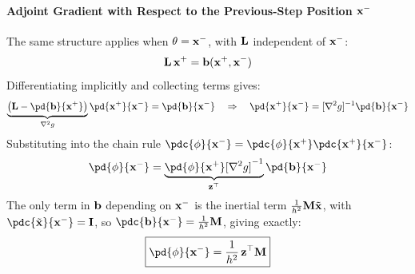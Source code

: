 \begin{derivation}
\paragraph{Adjoint Gradient with Respect to the Previous-Step Position $\mathbf{x}^-$}
\mbox{}

\noindent The same structure applies when $\theta = \mathbf{x}^-$, with $\mathbf{L}$ 
independent of $\mathbf{x}^-$:
\begin{equation*}
    \mathbf{L}\,\mathbf{x}^+ = \mathbf{b}(\mathbf{x}^+, \mathbf{x}^-)
\end{equation*}
Differentiating implicitly and collecting terms gives:
\begin{equation}
    \underbrace{\left(\LL - \pd{\bb}{\x^+}\right)}_{\nabla^2 g}
    \pd{\x^+}{\x^-}
    =
    \pd{\bb}{\x^-}
    \quad\Rightarrow\quad
    \pd{\x^+}{\x^-} = [\nabla^2 g]^{-1}\pd{\bb}{\x^-}
\end{equation}
Substituting into the chain rule $\pdc{\phi}{\x^-} = 
\pdc{\phi}{\x^+}\pdc{\x^+}{\x^-}$:
\begin{equation}
    \pd{\phi}{\x^-}
    =
    \underbrace{\pd{\phi}{\x^+}[\nabla^2 g]^{-1}}_{\z^\top}
    \pd{\bb}{\x^-}
\end{equation}
The only term in $\mathbf{b}$ depending on $\mathbf{x}^-$ is the inertial term 
$\frac{1}{h^2}\mathbf{M}\tilde{\mathbf{x}}$, with $\pdc{\tilde{\x}}{\x^-} 
= \I$, so $\pdc{\bb}{\x^-} = \frac{1}{h^2}\M$, giving exactly:
\begin{equation}
    \boxed{
    \pd{\phi}{\x^-}
    =
    \frac{1}{h^2}\,\z^\top\M
    }
\end{equation}
\end{derivation}


